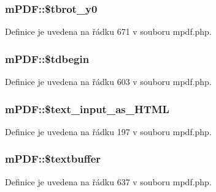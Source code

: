 \hypertarget{classm_p_d_f_a0135161d62802aa6eb3e53bca83a5cac}{
\subsubsection[{\$tbrot\-\_\-y0}]{\setlength{\rightskip}{0pt plus 5cm}m\-P\-D\-F\-::\$tbrot\-\_\-y0}}\label{classm_p_d_f_a0135161d62802aa6eb3e53bca83a5cac}


Definice je uvedena na řádku 671 v souboru mpdf.\-php.

\hypertarget{classm_p_d_f_a38c39c5a158bcb0934481c0c6ed02040}{
\subsubsection[{\$tdbegin}]{\setlength{\rightskip}{0pt plus 5cm}m\-P\-D\-F\-::\$tdbegin}}\label{classm_p_d_f_a38c39c5a158bcb0934481c0c6ed02040}


Definice je uvedena na řádku 603 v souboru mpdf.\-php.

\hypertarget{classm_p_d_f_a44d56f9feb36ac4aef2af4fe59cc09d8}{
\subsubsection[{\$text\-\_\-input\-\_\-as\-\_\-\-H\-T\-M\-L}]{\setlength{\rightskip}{0pt plus 5cm}m\-P\-D\-F\-::\$text\-\_\-input\-\_\-as\-\_\-\-H\-T\-M\-L}}\label{classm_p_d_f_a44d56f9feb36ac4aef2af4fe59cc09d8}


Definice je uvedena na řádku 197 v souboru mpdf.\-php.

\hypertarget{classm_p_d_f_adbb71d5b8474bc277f64422b8458cb66}{
\subsubsection[{\$textbuffer}]{\setlength{\rightskip}{0pt plus 5cm}m\-P\-D\-F\-::\$textbuffer}}\label{classm_p_d_f_adbb71d5b8474bc277f64422b8458cb66}


Definice je uvedena na řádku 637 v souboru mpdf.\-php.


